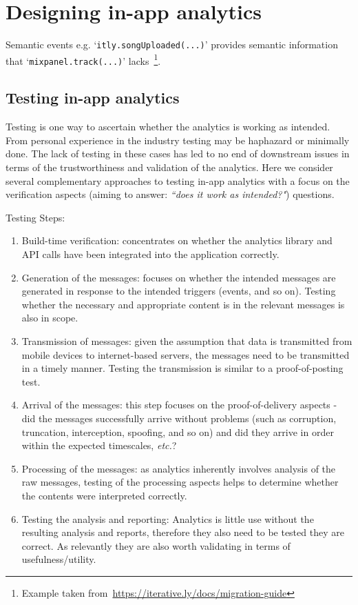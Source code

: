 \section{Designing in-app analytics}

Semantic events e.g. `\texttt{itly.songUploaded(...)}' provides semantic information that `\texttt{mixpanel.track(...)}' lacks~\footnote{Example taken from~\url{https://iterative.ly/docs/migration-guide}}.

\subsection{Testing in-app analytics}
Testing is one way to ascertain whether the analytics is working as intended. From personal experience in the industry testing may be haphazard or minimally done. The lack of testing in these cases has led to no end of downstream issues in terms of the trustworthiness and validation of the analytics. Here we consider several complementary approaches to testing in-app analytics with a focus on the verification aspects (aiming to answer: \emph{``does it work as intended?"}) questions.

Testing Steps:
\begin{enumerate}
    \item Build-time verification: concentrates on whether the analytics library and API calls have been integrated into the application correctly.
    \item Generation of the messages: focuses on whether the intended messages are generated in response to the intended triggers (events, and so on). Testing whether the necessary and appropriate content is in the relevant messages is also in scope. 
    \item Transmission of messages: given the assumption that data is transmitted from mobile devices to internet-based servers, the messages need to be transmitted in a timely manner. Testing the transmission is similar to a proof-of-posting test. 
    \item Arrival of the messages: this step focuses on the proof-of-delivery aspects - did the messages successfully arrive without problems (such as corruption, truncation, interception, spoofing, and so on) and did they arrive in order within the expected timescales, \emph{etc.}? 
    \item Processing of the messages: as analytics inherently involves analysis of the raw messages, testing of the processing aspects helps to determine whether the contents were interpreted correctly. 
    \item Testing the analysis and reporting: Analytics is little use without the resulting analysis and reports, therefore they also need to be tested they are correct. As relevantly they are also worth validating in terms of usefulness/utility. 
\end{enumerate}

